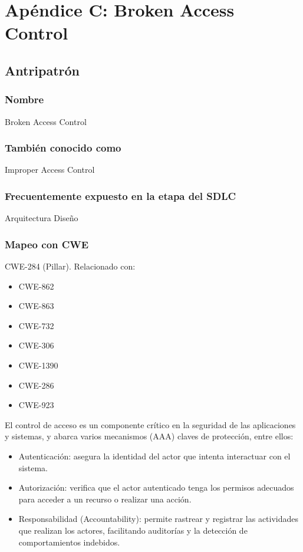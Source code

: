 
\chapter{Apéndice C: Broken Access Control}

\section{Antripatrón}

\subsection{Nombre}
Broken Access Control
\subsection{También conocido como}
Improper Access Control
\subsection{Frecuentemente expuesto en la etapa del SDLC}
Arquitectura 
Diseño
\subsection{Mapeo con CWE}
CWE-284 (Pillar). Relacionado con:
\begin{itemize}
    \item CWE-862
    \item CWE-863
    \item CWE-732
    \item CWE-306
    \item CWE-1390
    \item CWE-286
    \item CWE-923
\end{itemize}
El control de acceso es un componente crítico en la seguridad de las aplicaciones y sistemas, y abarca varios mecanismos (AAA) claves de protección, entre ellos:

    \begin{itemize}
        \item Autenticación: asegura la identidad del actor que intenta interactuar con el sistema.
        \item Autorización: verifica que el actor autenticado tenga los permisos adecuados para acceder a un recurso o realizar una acción.
        \item Responsabilidad (Accountability): permite rastrear y registrar las actividades que realizan los actores, facilitando auditorías y la detección de comportamientos indebidos.
    \end{itemize}

